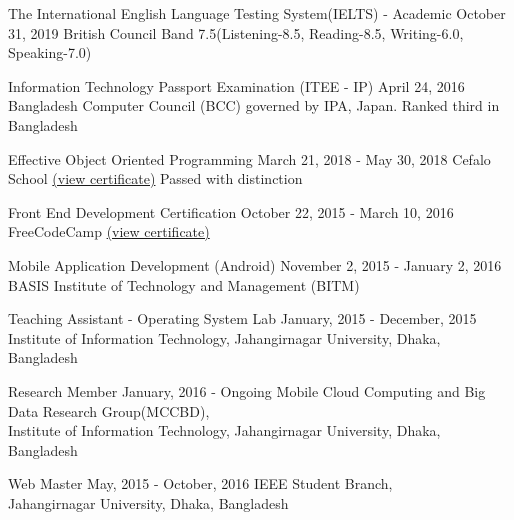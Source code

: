 \cvcertificateresult
{The International English Language Testing System(IELTS) - Academic}
{October 31, 2019}
{British Council}
{Band 7.5(Listening-8.5, Reading-8.5, Writing-6.0, Speaking-7.0)}
\divider

\cvcertificateresult
{Information Technology Passport Examination (ITEE - IP)}
{April 24, 2016}
{Bangladesh Computer Council (BCC) governed by IPA, Japan.}
{Ranked third in Bangladesh}
\divider

\cvcertificateresult
{Effective Object Oriented Programming}
{March 21, 2018 - May 30, 2018}
{Cefalo School \href{https://school.cefalolab.com/20181104.pdf}{(view certificate)}}
{Passed with distinction}

\divider

\cvcertificate
{Front End Development Certification}
{October 22, 2015 - March 10, 2016}
{FreeCodeCamp \href{https://www.freecodecamp.org/certification/arsho/legacy-front-end}{(view certificate)}}
\divider

\cvcertificate
{Mobile Application Development (Android)}
{November 2, 2015 - January 2, 2016}
{BASIS Institute of Technology and Management (BITM)}


\medskip

\cvcertificate
{Teaching Assistant - Operating System Lab}
{January, 2015 - December, 2015}
{Institute of Information Technology, Jahangirnagar University, Dhaka, Bangladesh}
\divider

\cvcertificate
{Research Member}
{January, 2016 - Ongoing}
{Mobile Cloud Computing and Big Data Research Group(MCCBD), 
\\Institute of Information Technology, Jahangirnagar University, Dhaka, Bangladesh}

\divider

\cvcertificate
{Web Master}
{May, 2015 - October, 2016}
{IEEE Student Branch, \\Jahangirnagar University, Dhaka, Bangladesh}

\medskip


